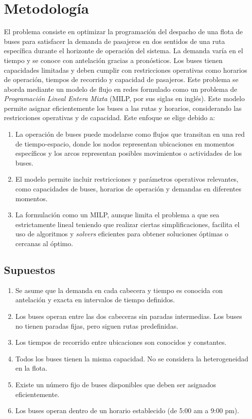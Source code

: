 \documentclass[preprint,11pt]{elsarticle}
\begin{document}
\section{Metodología}

El problema consiste en optimizar la programación del despacho de una flota de buses para satisfacer la demanda de pasajeros en dos sentidos de una ruta específica durante el horizonte de operación del sistema. La demanda varía en el tiempo y se conoce con antelación gracias a pronósticos. Los buses tienen capacidades limitadas y deben cumplir con restricciones operativas como horarios de operación, tiempos de recorrido y capacidad de pasajeros. Este problema se aborda mediante un modelo de flujo en redes formulado como un problema de \textit{Programación Lineal Entera Mixta} (MILP, por sus siglas en inglés). Este modelo permite asignar eficientemente los buses a las rutas y horarios, considerando las restricciones operativas y de capacidad. Este enfoque se elige debido a:

\begin{enumerate}
    \item La operación de buses puede modelarse como flujos que transitan en una red de tiempo-espacio, donde los nodos representan ubicaciones en momentos específicos y los arcos representan posibles movimientos o actividades de los buses.
    \item El modelo permite incluir restricciones y parámetros operativos relevantes, como capacidades de buses, horarios de operación y demandas en diferentes momentos.
    \item La formulación como un MILP, aunque limita el problema a que sea estrictamente lineal teniendo que realizar ciertas simplificaciones, facilita el uso de algoritmos y \textit{solvers} eficientes para obtener soluciones óptimas o cercanas al óptimo.
\end{enumerate}

\subsection{Supuestos}
\begin{enumerate}
    \item Se asume que la demanda en cada cabecera y tiempo es conocida con antelación y exacta en intervalos de tiempo definidos.
    \item Los buses operan entre las dos cabeceras sin paradas intermedias. Los buses no tienen paradas fijas, pero siguen rutas predefinidas.
    \item Los tiempos de recorrido entre ubicaciones son conocidos y constantes.
    \item Todos los buses tienen la misma capacidad. No se considera la heterogeneidad en la flota.
    \item Existe un número fijo de buses disponibles que deben ser asignados eficientemente.
    \item Los buses operan dentro de un horario establecido (de 5:00 am a 9:00 pm).
\end{enumerate}
\end{document}
